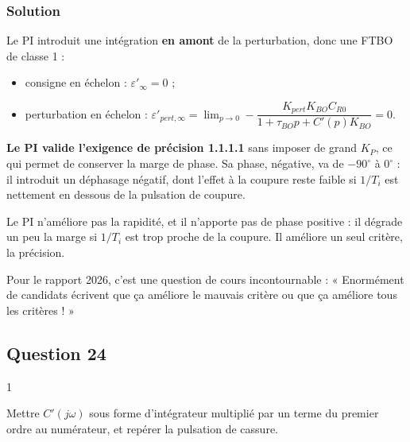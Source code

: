 \documentclass[11pt,a4paper]{article}
\providecommand{\tightlist}{\setlength{\itemsep}{0pt}\setlength{\parskip}{0pt}}
\begin{document}
\hypertarget{solution-22}{%
\subsubsection{Solution}\label{solution-22}}

Le PI introduit une intégration \textbf{en amont} de la perturbation, donc une FTBO de classe 1 :

\begin{itemize}
\tightlist
\item
  consigne en échelon : \(\varepsilon'_\infty=0\) ;
\item
  perturbation en échelon : \(\varepsilon'_{pert,\infty}=\lim_{p\to0}-\dfrac{K_{pert}K_{BO}C_{R0}}{1+\tau_{BO}p+C'(p)K_{BO}}=0\).
\end{itemize}

\textbf{Le PI valide l'exigence de précision 1.1.1.1} sans imposer de grand \(K_P\), ce qui permet de conserver la marge de phase. Sa phase, négative, va de \(-90^\circ\) à \(0^\circ\) : il introduit un déphasage négatif, dont l'effet à la coupure reste faible si \(1/T_i\) est nettement en dessous de la pulsation de coupure.

\begin{piege}

Le PI n'améliore pas la rapidité, et il n'apporte pas de phase positive : il dégrade un peu la marge si \(1/T_i\) est trop proche de la coupure. Il améliore un seul critère, la précision.

\end{piege}

\begin{jury}

Pour le rapport 2026, c'est une question de cours incontournable : « Enormément de candidats écrivent que ça améliore le mauvais critère ou que ça améliore tous les critères ! »

\end{jury}

\hypertarget{question-24}{%
\subsection{Question 24}\label{question-24}}

\begin{indication}{1}

Mettre \(C'(j\omega)\) sous forme d'intégrateur multiplié par un terme du premier ordre au numérateur, et repérer la pulsation de cassure.

\end{indication}
\end{document}

